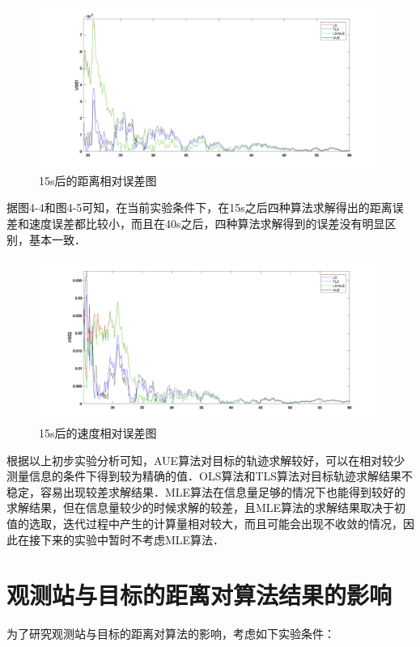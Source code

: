 \begin{figure}[h]
	\centering
	\includegraphics[width=\linewidth]{images/zoomsingleline.png}
	\caption{15s后的距离相对误差图}
\end{figure}
据图4-4和图4-5可知，在当前实验条件下，在15s之后四种算法求解得出的距离误差和速度误差都比较小，而且在40s之后，四种算法求解得到的误差没有明显区别，基本一致．
\newpage
\begin{figure}[htbp]
	\vspace{13pt}
	\centering
	\includegraphics[width=\linewidth]{images/line_vzoom.png}
	\caption{15s后的速度相对误差图}
\end{figure}

根据以上初步实验分析可知，AUE算法对目标的轨迹求解较好，可以在相对较少测量信息的条件下得到较为精确的值．OLS算法和TLS算法对目标轨迹求解结果不稳定，容易出现较差求解结果．MLE算法在信息量足够的情况下也能得到较好的求解结果，但在信息量较少的时候求解的较差，且MLE算法的求解结果取决于初值的选取，迭代过程中产生的计算量相对较大，而且可能会出现不收敛的情况，因此在接下来的实验中暂时不考虑MLE算法．
\section{观测站与目标的距离对算法结果的影响}
为了研究观测站与目标的距离对算法的影响，考虑如下实验条件：

